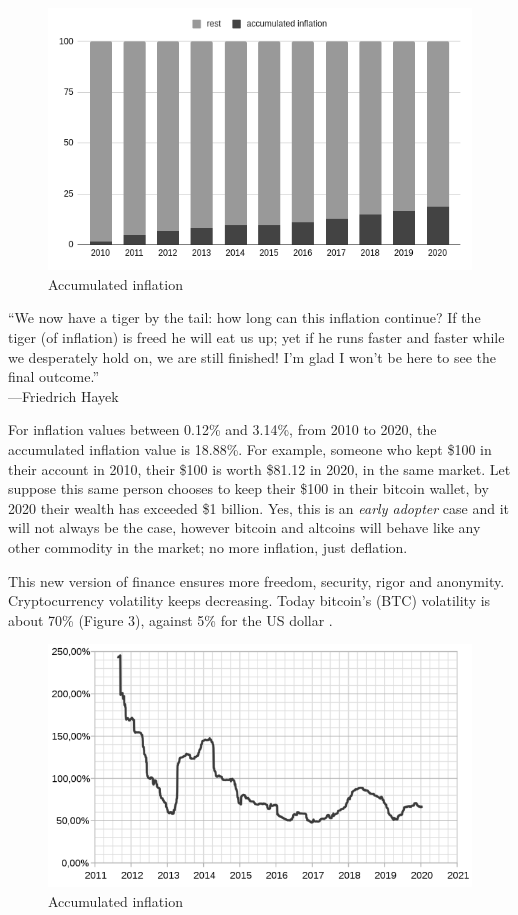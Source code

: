 \documentclass[12pt]{article}
\begin{document}
\begin{figure}[!h]
  \centering
  \includegraphics[width=.8\linewidth]{figure2}
  \caption{Accumulated inflation}
  \label{fig:f2}
\end{figure}

“We now have a tiger by the tail: how long can this inflation continue? If the tiger (of inflation) is freed he will eat us up; yet if he runs faster and faster while we desperately hold on, we are still finished! I'm glad I won't be here to see the final outcome.”\\
—Friedrich Hayek \cite{hayek1971tiger}\\
{}

For inflation values between 0.12\% and 3.14\%, from 2010 to 2020, the accumulated inflation value is 18.88\%. For example, someone who kept \$100 in their account in 2010, their \$100 is worth \$81.12 in 2020, in the same market. Let suppose this same person chooses to keep their \$100 in their bitcoin wallet, by 2020 their wealth has exceeded \$1 billion. Yes, this is an \emph{early adopter} case and it will not always be the case, however bitcoin and altcoins will behave like any other commodity in the market; no more inflation, just deflation.

This new version of finance ensures more freedom, security, rigor and anonymity. Cryptocurrency volatility keeps decreasing. Today bitcoin's (BTC) volatility is about 70\% (Figure 3), against 5\% for the US dollar \cite{usd2020volatility}.
\clearpage
\begin{figure}[!h]
  \centering
  \includegraphics[width=.8\linewidth]{figure31}
  \caption{Accumulated inflation}
  \label{fig:f2}
\end{figure}
\end{document}
